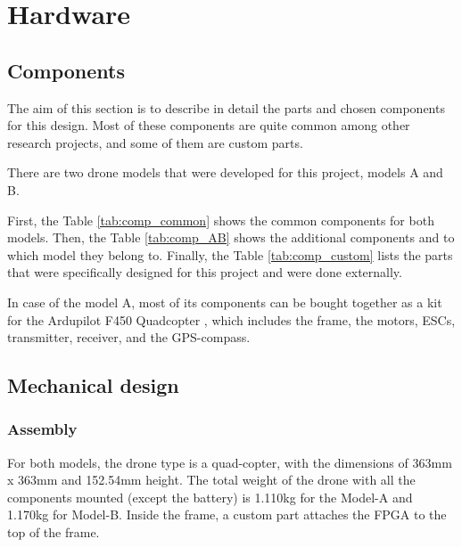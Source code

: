 \chapter{Hardware}\label{ch:hw}

\section{Components}
The aim of this section is to describe in detail the parts and chosen components for this design. Most of these components are quite common among other research projects, and some of them are custom parts.

There are two drone models that were developed for this project, models A and B. 

First, the Table \ref{tab:comp_common} shows the common components for both models. Then, the Table \ref{tab:comp_AB} shows the additional components and to which model they belong to. Finally, the Table \ref{tab:comp_custom} lists the parts that were specifically designed for this project and were done externally.









In case of the model A, most of its components can be bought together as a kit for the Ardupilot F450 Quadcopter \cite{bib:drone_Kit}, which includes the frame, the motors, ESCs, transmitter, receiver, and the GPS-compass.

\section{Mechanical design}\label{sec:hw_mec}

\subsection{Assembly}

For both models, the drone type is a quad-copter, with the dimensions of 363mm x 363mm and 152.54mm height. The total weight of the drone with all the components mounted (except the battery) is 1.110kg for the Model-A and 1.170kg for Model-B. Inside the frame, a custom part attaches the FPGA to the top of the frame.

